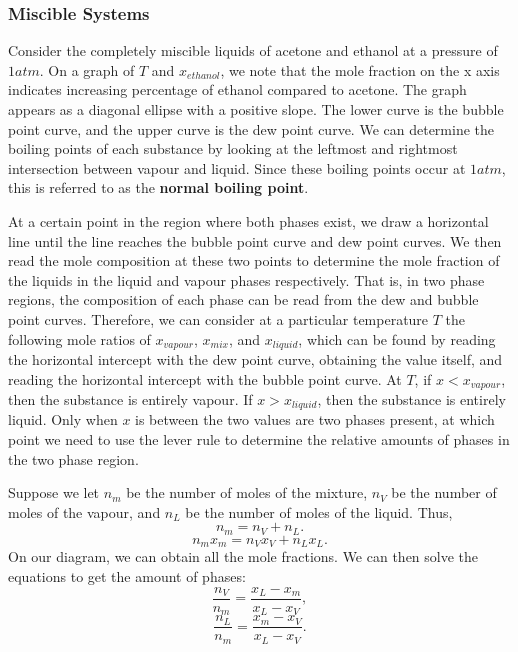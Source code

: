 \documentclass[11pt]{article}
\theoremstyle{plain} %
\theoremstyle{definition}
\theoremstyle{example}
\theoremstyle{remark}
\begin{document}
\subsubsection{Miscible Systems}

Consider the completely miscible liquids of acetone and ethanol at a pressure of $1atm$. On a graph of $T$ and $x_{ethanol}$, we note that the mole fraction on the x axis indicates increasing percentage of ethanol compared to acetone. The graph appears as a diagonal ellipse with a positive slope. The lower curve is the bubble point curve, and the upper curve is the dew point curve. We can determine the boiling points of each substance by looking at the leftmost and rightmost intersection between vapour and liquid. Since these boiling points occur at $1atm$, this is referred to as the \textbf{normal boiling point}. 

At a certain point in the region where both phases exist, we draw a horizontal line until the line reaches the bubble point curve and dew point curves. We then read the mole composition at these two points to determine the mole fraction of the liquids in the liquid and vapour phases respectively. That is, in two phase regions, the composition of each phase can be read from the dew and bubble point curves. Therefore, we can consider at a particular temperature $T$ the following mole ratios of 
$x_{vapour}$, $x_{mix}$, and $x_{liquid}$, which can be found by reading the horizontal intercept with the dew point curve, obtaining the value itself, and reading the horizontal intercept with the bubble point curve. At $T$, if $x < x_{vapour}$, then the substance is entirely vapour. If $x > x_{liquid}$, then the substance is entirely liquid. Only when $x$ is between the two values are two phases present, at which point we need to use the lever rule to determine the relative amounts of phases in the two phase region.

Suppose we let $n_m$ be the number of moles of the mixture, $n_V$ be the number of moles of the vapour, and $n_L$ be the number of moles of the liquid. Thus,
$$n_m = n_V + n_L.$$  
$$n_mx_m = n_Vx_V + n_Lx_L.$$
On our diagram, we can obtain all the mole fractions. We can then solve the equations to get the amount of phases:
$$\frac{n_V}{n_m} = \frac{x_L-x_m}{x_L-x_V},$$
$$\frac{n_L}{n_m} = \frac{x_m-x_V}{x_L-x_V}.$$
\end{document}
